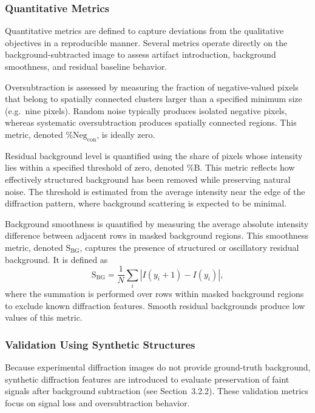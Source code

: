 \documentclass[iucr,review]{iucrjournals}
\begin{document}
\subsubsection{Quantitative Metrics}

Quantitative metrics are defined to capture deviations from the qualitative objectives in a reproducible manner. Several metrics operate directly on the background-subtracted image to assess artifact introduction, background smoothness, and residual baseline behavior.

Oversubtraction is assessed by measuring the fraction of negative-valued pixels that belong to spatially connected clusters larger than a specified minimum size (e.g.\ nine pixels). Random noise typically produces isolated negative pixels, whereas systematic oversubtraction produces spatially connected regions. This metric, denoted $\%\mathrm{Neg}_{\mathrm{con}}$, is ideally zero.

Residual background level is quantified using the share of pixels whose intensity lies within a specified threshold of zero, denoted $\%\mathrm{B}$. This metric reflects how effectively structured background has been removed while preserving natural noise. The threshold is estimated from the average intensity near the edge of the diffraction pattern, where background scattering is expected to be minimal.

Background smoothness is quantified by measuring the average absolute intensity difference between adjacent rows in masked background regions. This smoothness metric, denoted $\mathrm{S}_{\mathrm{BG}}$, captures the presence of structured or oscillatory residual background. It is defined as
\begin{equation}
\mathrm{S}_{\mathrm{BG}} =
\frac{1}{N} \sum_i \left| I(y_i + 1) - I(y_i) \right|,
\end{equation}
where the summation is performed over rows within masked background regions to exclude known diffraction features. Smooth residual backgrounds produce low values of this metric.

\subsubsection{Validation Using Synthetic Structures}

Because experimental diffraction images do not provide ground-truth background, synthetic diffraction features are introduced to evaluate preservation of faint signals after background subtraction (see Section~3.2.2). These validation metrics focus on signal loss and oversubtraction behavior.
\end{document}
